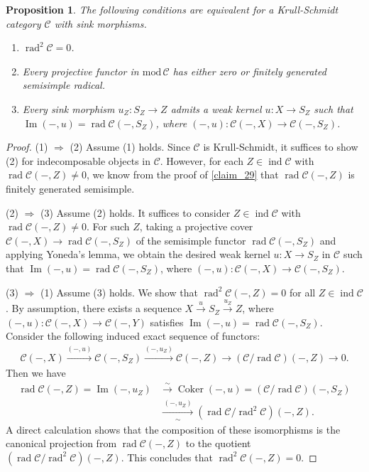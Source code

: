\documentclass[12pt]{amsart}
\numberwithin{equation}{subsection}
\theoremstyle{plain}
\newtheorem{proposition}[theorem]{Proposition}
\theoremstyle{definition}
\renewcommand{\Im}{\operatorname{Im}}
\newcommand{\Coker}{\operatorname{Coker}\nolimits}
\newcommand{\rad}{\operatorname{rad}}
\renewcommand{\mod}{\mathrm{mod}\,}
\newcommand{\ind}{\operatorname{ind}}
\newcommand{\C}{\mathcal{C}}
\begin{document}
\begin{proposition}\label{claim_15}
The following conditions are equivalent for a Krull-Schmidt category $\C$ with sink morphisms.
\begin{enumerate}
\item $\rad^2\C = 0$.
\item Every projective functor in $\mod\C$ has either zero or finitely generated semisimple radical.
\item Every sink morphism $u_Z:S_Z \to Z$ admits a weak kernel $u:  X \to S_Z$ such that $\Im(-,u) = \rad\C(-, S_Z)$, where $(-,u): \C(-, X) \to\C(-, S_Z)$.
\end{enumerate}
\end{proposition}
\begin{proof} 
(1) $\Rightarrow$ (2)
Assume (1) holds.
Since $\C$ is Krull-Schmidt, it suffices to show (2) for indecomposable objects in $\C$. 
However, for each $Z\in\ind\C$ with $\rad\C(-, Z)\neq 0$, we know from the proof of \cref{claim_29} that $\rad\C(-, Z)$ is finitely generated semisimple.




(2) $\Rightarrow$ (3)
Assume (2) holds.
It suffices to consider $Z\in\ind\C$ with $\rad\C(-, Z)\neq0$.
For such $Z$, taking a projective cover $\C(-, X) \to \rad\C(-, S_Z)$ of the semisimple functor $\rad\C(-, S_Z)$ and applying Yoneda's lemma, we obtain the desired weak kernel $u: X\to S_Z$ in $\C$ such that $\Im(-,u) = \rad\C(-, S_Z)$, where $(-,u): \C(-, X) \to\C(-, S_Z)$.





(3) $\Rightarrow$ (1)
Assume (3) holds.
We show that $\rad^2\C(-, Z) = 0$ for all $Z \in \ind\C$. 
By assumption, there exists a sequence $X\xrightarrow{u}S_Z\xrightarrow{u_Z}Z$, where $(-,u): \C(-, X) \to\C(-, Y)$ satisfies $\Im(-,u) = \rad\C(-, S_Z)$.
Consider the following induced exact sequence of functors:
\begin{align}
    \C(-, X) \xrightarrow{(-, u)}
    \C(-, S_Z) \xrightarrow{(-, u_Z)}
    \C(-, Z) \to
    (\C/\rad\C)(-, Z) \to 0.
\end{align}
Then we have 
\begin{align}\label{eq_1}
    \rad\C(-, Z) = \Im(-, u_Z)
    &\xrightarrow{\,\sim\,} \Coker(-, u) = (\C/\rad\C)(-, S_Z) \\
    &\xrightarrow[\sim]{\,(-, u_Z)\,} (\rad\C/\rad^2\C)(-, Z). 
\end{align}
A direct calculation shows that the composition of these isomorphisms is the canonical projection from $\rad\C(-, Z)$ to the quotient $(\rad\C/\rad^2\C)(-, Z)$.
This concludes that $\rad^2\C(-, Z) = 0$.
\end{proof}
\end{document}
